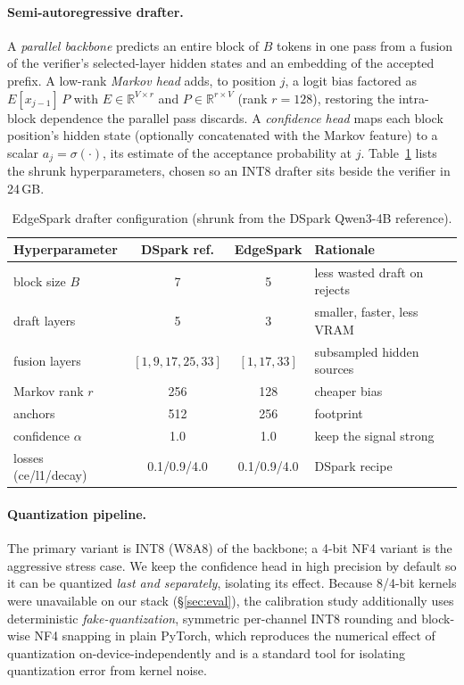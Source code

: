\documentclass[11pt]{article}
\theoremstyle{plain}
\theoremstyle{definition}
\begin{document}
\paragraph{Semi-autoregressive drafter.}
A \emph{parallel backbone} predicts an entire block of $B$ tokens in one pass
from a fusion of the verifier's selected-layer hidden states and an embedding of
the accepted prefix. A low-rank \emph{Markov head} adds, to position $j$, a
logit bias factored as $E[x_{j-1}]\,P$ with $E\in\mathbb{R}^{V\times r}$ and
$P\in\mathbb{R}^{r\times V}$ (rank $r{=}128$), restoring the intra-block
dependence the parallel pass discards. A \emph{confidence head} maps each block
position's hidden state (optionally concatenated with the Markov feature) to a
scalar $a_j=\sigma(\cdot)$, its estimate of the acceptance probability at $j$.
Table~\ref{tab:config} lists the shrunk hyperparameters, chosen so an INT8
drafter sits beside the verifier in 24\,GB.

\begin{table}[t]
\centering\small
\caption{EdgeSpark drafter configuration (shrunk from the DSpark Qwen3-4B
reference).}
\label{tab:config}
\begin{tabular}{lccl}
\toprule
Hyperparameter & DSpark ref. & EdgeSpark & Rationale \\
\midrule
block size $B$          & 7            & 5             & less wasted draft on rejects \\
draft layers            & 5            & 3             & smaller, faster, less VRAM \\
fusion layers           & $[1,9,17,25,33]$ & $[1,17,33]$ & subsampled hidden sources \\
Markov rank $r$         & 256          & 128           & cheaper bias \\
anchors                 & 512          & 256           & footprint \\
confidence $\alpha$     & 1.0          & 1.0           & keep the signal strong \\
losses (ce/l1/decay)    & 0.1/0.9/4.0  & 0.1/0.9/4.0   & DSpark recipe \\
\bottomrule
\end{tabular}
\end{table}

\paragraph{Quantization pipeline.}
The primary variant is INT8 (W8A8) of the backbone; a 4-bit NF4 variant is the
aggressive stress case. We keep the confidence head in high precision by default
so it can be quantized \emph{last and separately}, isolating its effect. Because
8/4-bit kernels were unavailable on our stack (\S\ref{sec:eval}), the calibration
study additionally uses deterministic \emph{fake-quantization}, symmetric
per-channel INT8 rounding and block-wise NF4 snapping in plain PyTorch, which
reproduces the numerical effect of quantization on-device-independently and is a
standard tool for isolating quantization error from kernel noise.
\end{document}
